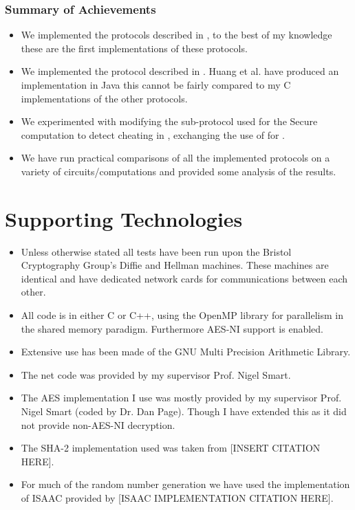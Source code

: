 \documentclass[ %
                    author={Nicholas Tutte},
                supervisor={Prof. Nigel Smart},
                    degree={MEng},
                     title={Secure Two Party Computation},
                  subtitle={A practical comparison of recent protocols},
                      type={Research - GG1K},
                      year={2015} ]{dissertation}
\begin{document}
			\subsubsection*{Summary of Achievements}
				\begin{itemize}
					\item We implemented the protocols described in \cite{LindellAndPinkas2011, Lindell_CnC_2013}, to the best of my knowledge these are the first implementations of these protocols.
					\item We implemented the protocol described in \cite{Katz_Symm_CnC_2013}. Huang et al. have produced an implementation in Java this cannot be fairly compared to my C implementations of the other protocols. 
					\item We experimented with modifying the sub-protocol used for the Secure computation to detect cheating in \cite{Lindell_CnC_2013}, exchanging the use of \cite{LindellAndPinkas2011} for \cite{Katz_Symm_CnC_2013}.
					\item We have run practical comparisons of all the implemented protocols on a variety of circuits/computations and provided some analysis of the results.
				\end{itemize}

		\section*{Supporting Technologies}
			\begin{itemize}
					\item Unless otherwise stated all tests have been run upon the Bristol Cryptography Group's Diffie and Hellman machines. These machines are identical and have dedicated network cards for communications between each other.
					\item All code is in either C or C++, using the OpenMP library for parallelism in the shared memory paradigm. Furthermore AES-NI support is enabled.
					\item Extensive use has been made of the GNU Multi Precision Arithmetic Library.
					\item The net code was provided by my supervisor Prof. Nigel Smart.
					\item The AES implementation I use was mostly provided by my supervisor Prof. Nigel Smart (coded by Dr. Dan Page). Though I have extended this as it did not provide non-AES-NI decryption.
					\item The SHA-2 implementation used was taken from [INSERT CITATION HERE].
					\item For much of the random number generation we have used the implementation of ISAAC provided by [ISAAC IMPLEMENTATION CITATION HERE].
			\end{itemize}
\end{document}
